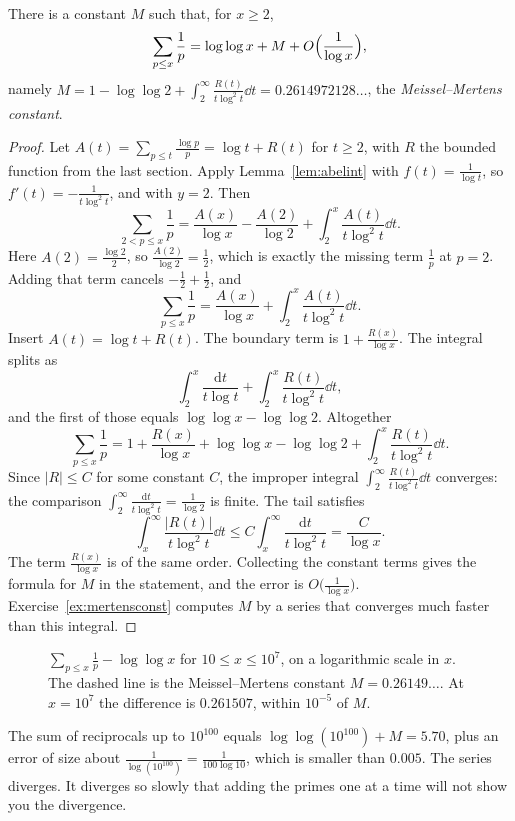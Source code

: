 \begin{theorem}[Mertens, 1874]\label{thm:mertens2}
There is a constant $M$ such that, for $x\ge 2$,
\[
\sum_{p\le x}\frac1p=\log\log x+M+O\Bigl(\frac1{\log x}\Bigr),
\]
namely $M=1-\log\log 2+\int_2^\infty\frac{R(t)}{t\log^2 t}\dd t=0.2614972128\ldots$, the \emph{Meissel--Mertens constant}.
\end{theorem}
\begin{proof}
Let $A(t)=\sum_{p\le t}\frac{\log p}p=\log t+R(t)$ for $t\ge 2$, with $R$ the bounded function from the last section. Apply Lemma~\ref{lem:abelint} with $f(t)=\frac1{\log t}$, so $f'(t)=-\frac1{t\log^2 t}$, and with $y=2$. Then
\[
\sum_{2<p\le x}\frac1p=\frac{A(x)}{\log x}-\frac{A(2)}{\log 2}+\int_2^x\frac{A(t)}{t\log^2 t}\dd t.
\]
Here $A(2)=\frac{\log 2}2$, so $\frac{A(2)}{\log 2}=\frac12$, which is exactly the missing term $\frac1p$ at $p=2$. Adding that term cancels $-\frac12+\frac12$, and
\[
\sum_{p\le x}\frac1p=\frac{A(x)}{\log x}+\int_2^x\frac{A(t)}{t\log^2 t}\dd t.
\]
Insert $A(t)=\log t+R(t)$. The boundary term is $1+\frac{R(x)}{\log x}$. The integral splits as
\[
\int_2^x\frac{\mathrm dt}{t\log t}+\int_2^x\frac{R(t)}{t\log^2 t}\dd t,
\]
and the first of those equals $\log\log x-\log\log 2$. Altogether
\[
\sum_{p\le x}\frac1p=1+\frac{R(x)}{\log x}+\log\log x-\log\log 2+\int_2^x\frac{R(t)}{t\log^2 t}\dd t.
\]
Since $|R|\le C$ for some constant $C$, the improper integral $\int_2^\infty\frac{R(t)}{t\log^2 t}\dd t$ converges: the comparison $\int_2^\infty\frac{\mathrm dt}{t\log^2 t}=\frac1{\log 2}$ is finite. The tail satisfies
\[
\int_x^\infty\frac{|R(t)|}{t\log^2 t}\dd t\le C\int_x^\infty\frac{\mathrm dt}{t\log^2 t}=\frac C{\log x}.
\]
The term $\frac{R(x)}{\log x}$ is of the same order. Collecting the constant terms gives the formula for $M$ in the statement, and the error is $O\bigl(\frac1{\log x}\bigr)$. Exercise~\ref{ex:mertensconst} computes $M$ by a series that converges much faster than this integral.
\end{proof}

\begin{figure}[ht]
\centering
{}
\caption{$\sum_{p\le x}\frac1p-\log\log x$ for $10\le x\le 10^7$, on a logarithmic scale in $x$. The dashed line is the Meissel--Mertens constant $M=0.26149\ldots$. At $x=10^7$ the difference is $0.261507$, within $10^{-5}$ of $M$.}
\label{fig:mertens}
\end{figure}

The sum of reciprocals up to $10^{100}$ equals $\log\log(10^{100})+M=5.70$, plus an error of size about $\frac1{\log(10^{100})}=\frac1{100\log 10}$, which is smaller than $0.005$. The series diverges. It diverges so slowly that adding the primes one at a time will not show you the divergence.

